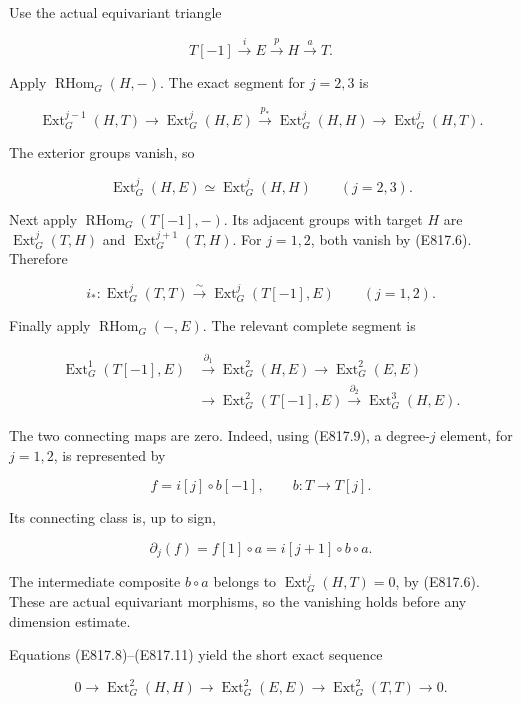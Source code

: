 Use the actual equivariant triangle

\[
 T[-1]\xrightarrow{i}E\xrightarrow{p}H
       \xrightarrow{a}T.
 \tag{E817.7}
\]

Apply \(\operatorname{RHom}_G(H,-)\). The exact segment for \(j=2,3\) is

\[
 \operatorname{Ext}^{j-1}_G(H,T)
 \longrightarrow\operatorname{Ext}^{j}_G(H,E)
 \xrightarrow{p_*}\operatorname{Ext}^{j}_G(H,H)
 \longrightarrow\operatorname{Ext}^{j}_G(H,T).
\]

The exterior groups vanish, so

\[
 \operatorname{Ext}^{j}_G(H,E)
       \simeq\operatorname{Ext}^{j}_G(H,H)
       \qquad(j=2,3).
 \tag{E817.8}
\]

Next apply \(\operatorname{RHom}_G(T[-1],-)\). Its adjacent groups with
target \(H\) are \(\operatorname{Ext}^{j}_G(T,H)\) and
\(\operatorname{Ext}^{j+1}_G(T,H)\). For \(j=1,2\), both vanish by
(E817.6). Therefore

\[
 i_*:\operatorname{Ext}^{j}_G(T,T)
      \xrightarrow{\sim}\operatorname{Ext}^{j}_G(T[-1],E)
        \qquad(j=1,2).
 \tag{E817.9}
\]

Finally apply \(\operatorname{RHom}_G(-,E)\). The relevant complete
segment is

\[
 \begin{split}
 \operatorname{Ext}^1_G(T[-1],E)
 &\xrightarrow{\partial_1}\operatorname{Ext}^2_G(H,E)
 \longrightarrow\operatorname{Ext}^2_G(E,E)\\
 &\longrightarrow\operatorname{Ext}^2_G(T[-1],E)
 \xrightarrow{\partial_2}\operatorname{Ext}^3_G(H,E).
 \end{split}
 \tag{E817.10}
\]

The two connecting maps are zero. Indeed, using (E817.9), a degree-\(j\)
element, for \(j=1,2\), is represented by

\[
 f=i[j]\circ b[-1],\qquad b:T\longrightarrow T[j].
\]

Its connecting class is, up to sign,

\[
 \partial_j(f)=f[1]\circ a
             =i[j+1]\circ b\circ a.
 \tag{E817.11}
\]

The intermediate composite \(b\circ a\) belongs to
\(\operatorname{Ext}^j_G(H,T)=0\), by (E817.6). These are actual
equivariant morphisms, so the vanishing holds before any dimension
estimate.

Equations (E817.8)--(E817.11) yield the short exact sequence

\[
 0\longrightarrow\operatorname{Ext}^2_G(H,H)
   \longrightarrow\operatorname{Ext}^2_G(E,E)
   \longrightarrow\operatorname{Ext}^2_G(T,T)
   \longrightarrow0.
 \tag{E817.12}
\]

